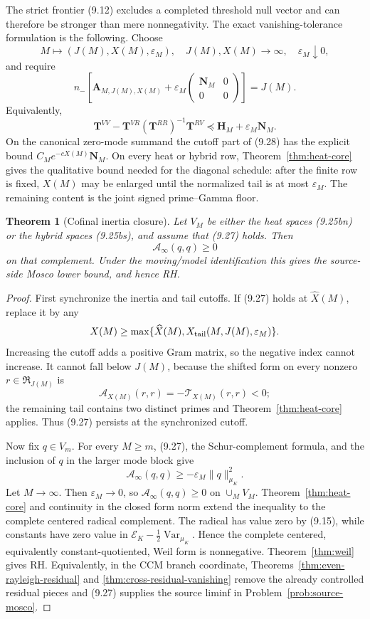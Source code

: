 \documentclass[11pt]{amsart}
\newtheorem{theorem}{Theorem}[section]
\theoremstyle{definition}
\theoremstyle{remark}
\begin{document}
The strict frontier (9.12) excludes a completed threshold null vector and
can therefore be stronger than mere nonnegativity.  The exact
vanishing-tolerance formulation is the following.  Choose
\[
 M\longmapsto(J(M),X(M),\varepsilon_M),
\quad J(M),X(M)\to\infty,\quad\varepsilon_M\downarrow0,
\tag{9.26}
\]
and require
\[
 \boxed{
 n_-\!\left[
 \mathbf A_{M,J(M),X(M)}
 +\varepsilon_M
 \begin{pmatrix}\mathbf N_M&0\\0&0\end{pmatrix}
 \right]=J(M).}
\tag{9.27}
\]
Equivalently,
\[
 \boxed{
 \mathbf T^{VV}
 -\mathbf T^{VR}(\mathbf T^{RR})^{-1}\mathbf T^{RV}
 \preceq\mathbf H_M+\varepsilon_M\mathbf N_M.}
\tag{9.28}
\]
On the canonical zero-mode summand the cutoff part of (9.28) has the
explicit bound \(C_Me^{-cX(M)}\mathbf N_M\).  On every heat or hybrid row,
Theorem~\ref{thm:heat-core} gives the qualitative bound needed for the
diagonal schedule: after the finite row is fixed, \(X(M)\) may be enlarged
until the normalized tail is at most \(\varepsilon_M\).  The remaining
content is the joint signed prime--Gamma floor.

\begin{theorem}[Cofinal inertia closure]
\label{thm:cofinal-inertia-closure}
Let \(V_M\) be either the heat spaces (9.25bn) or the hybrid spaces
(9.25bs), and assume that (9.27) holds.
Then
\[
 \mathcal A_\infty(q,q)\ge0
\tag{9.29}
\]
on that complement.  Under the moving/model identification this gives
the source-side Mosco lower bound, and hence RH.
\end{theorem}

\begin{proof}
First synchronize the inertia and tail cutoffs.  If (9.27) holds at
\(\widehat X(M)\), replace it by any
\[
 X(M)\ge\max\{\widehat X(M),X_{\rm tail}(M,J(M),\varepsilon_M)\}.
\]
Increasing the cutoff adds a positive Gram matrix, so the negative index
cannot increase.  It cannot fall below \(J(M)\), because the shifted form
on every nonzero \(r\in\mathfrak R_{J(M)}\) is
\[
 \mathcal A_{X(M)}(r,r)=-\mathcal T_{X(M)}(r,r)<0;
\]
the remaining tail contains two distinct primes and
Theorem~\ref{thm:heat-core} applies.  Thus (9.27) persists at the
synchronized cutoff.

Now fix \(q\in V_m\).  For every \(M\ge m\), (9.27), the Schur-complement
formula, and the inclusion of \(q\) in the larger mode block give
\[
 \mathcal A_\infty(q,q)
 \ge-\varepsilon_M\|q\|_{\mu_K}^2.
\]
Let \(M\to\infty\).  Then \(\varepsilon_M\to0\), so
\(\mathcal A_\infty(q,q)\ge0\) on \(\cup_MV_M\).
Theorem~\ref{thm:heat-core} and continuity in the closed form norm extend
the inequality to the complete centered radical complement.  The radical
has value zero by (9.15), while constants have zero value in
\(\mathscr E_K-\frac12\operatorname{Var}_{\mu_K}\).  Hence the complete
centered, equivalently constant-quotiented, Weil form is nonnegative.
Theorem~\ref{thm:weil} gives RH.  Equivalently, in the CCM
branch coordinate, Theorems~\ref{thm:even-rayleigh-residual} and
\ref{thm:cross-residual-vanishing} remove the already controlled residual
pieces and (9.27) supplies the source liminf in
Problem~\ref{prob:source-mosco}.
\end{proof}
\end{document}
